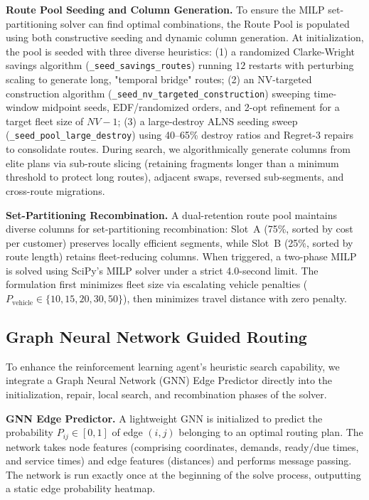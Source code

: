 \documentclass[conference]{IEEEtran}
\begin{document}
\textbf{Route Pool Seeding and Column Generation.}
To ensure the MILP set-partitioning solver can find optimal combinations, the Route Pool is populated using both constructive seeding and dynamic column generation. At initialization, the pool is seeded with three diverse heuristics:
(1) a randomized Clarke-Wright savings algorithm (\texttt{\_seed\_savings\_routes}) running $12$ restarts with perturbing scaling to generate long, "temporal bridge" routes;
(2) an NV-targeted construction algorithm (\texttt{\_seed\_nv\_targeted\_construction}) sweeping time-window midpoint seeds, EDF/randomized orders, and 2-opt refinement for a target fleet size of $NV-1$;
(3) a large-destroy ALNS seeding sweep (\texttt{\_seed\_pool\_large\_destroy}) using 40--65\% destroy ratios and Regret-3 repairs to consolidate routes.
During search, we algorithmically generate columns from elite plans via sub-route slicing (retaining fragments longer than a minimum threshold to protect long routes), adjacent swaps, reversed sub-segments, and cross-route migrations.

\textbf{Set-Partitioning Recombination.}
A dual-retention route pool maintains diverse columns for set-partitioning
recombination: Slot~A (75\%, sorted by cost per customer) preserves locally
efficient segments, while Slot~B (25\%, sorted by route length) retains
fleet-reducing columns. When triggered, a two-phase MILP is solved using SciPy's MILP solver under a strict 4.0-second limit. The formulation first minimizes fleet size via escalating vehicle penalties ($P_{\text{vehicle}} \in \{10, 15, 20, 30, 50\}$), then minimizes travel distance with zero penalty.

\subsection{Graph Neural Network Guided Routing}
\label{sec:gnn_guidance}

To enhance the reinforcement learning agent's heuristic search capability, we integrate a Graph Neural Network (GNN) Edge Predictor directly into the initialization, repair, local search, and recombination phases of the solver.

\textbf{GNN Edge Predictor.}
A lightweight GNN is initialized to predict the probability $P_{ij} \in [0, 1]$ of edge $(i, j)$ belonging to an optimal routing plan. The network takes node features (comprising coordinates, demands, ready/due times, and service times) and edge features (distances) and performs message passing. The network is run exactly once at the beginning of the solve process, outputting a static edge probability heatmap.
\end{document}
